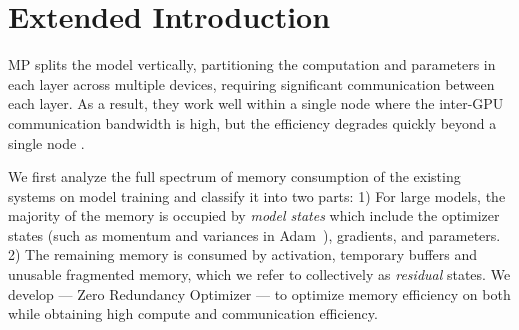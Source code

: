 \section{Extended Introduction}
\label{sec:introduction}

MP splits the model vertically, partitioning the computation and parameters in each layer across multiple devices, requiring significant communication between each layer. As a result, they work well within a single node where the inter-GPU communication bandwidth is high, but the efficiency degrades quickly beyond a single node \cite{megatronlm}.    

We first analyze the full spectrum of memory consumption of the existing systems on model training and classify it into two parts:  1) For large models, the majority of the memory is occupied by \emph{model states} which include the optimizer states (such as momentum and variances in Adam~\cite{DBLP:journals/corr/Adam}), gradients, and  parameters. 
2) The remaining memory is consumed by activation, temporary buffers and unusable fragmented memory, which we refer to collectively as \emph{residual} states.
We develop \name --- Zero Redundancy Optimizer  --- to optimize memory efficiency on both while obtaining high compute and communication efficiency.

